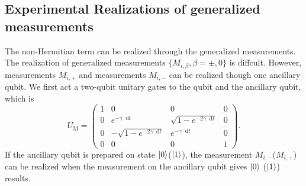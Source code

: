 \documentclass[longbibliography, aps, prx, amsmath, amssymb, amsfonts, twocolumn,superscriptaddress, footinbib]{revtex4-1}
\newcommand{\dif}{\mathop{}\!\mathrm{d}}
\begin{document}

	\subsection{Experimental Realizations of generalized measurements}
	The non-Hermitian term can be realized through the generalized measurements. The realization of generalized measurements $\{M_{i,\beta}, \beta=\pm,0\}$ is diffcult. However, measurements $M_{i,+}$ and measurements $M_{i,-}$ can be realized though one ancillary qubit. We first act a two-qubit unitary gates to the qubit and the ancillary qubit, which is
	\begin{equation}
		U_{\text{M}} = \begin{pmatrix}
		  1 & 0 & 0 & 0\\
		  0 & e^{-\gamma \dif t} & \sqrt{1-e^{-2 \gamma \dif t}} & 0\\
		  0 & -\sqrt{1-e^{-2 \gamma \dif t}} & e^{-\gamma \dif t} & 0\\
		  0 & 0 & 0 & 1
		\end{pmatrix}.
	\end{equation}
	If the ancillary qubit is prepared on state $\ket{0}$($\ket{1}$), the measurement $M_{i,-}$($M_{i,+}$) can be realized when the measurement on the ancillary qubit gives $\ket{0}$ ($\ket{1}$) results. 
\end{document}

